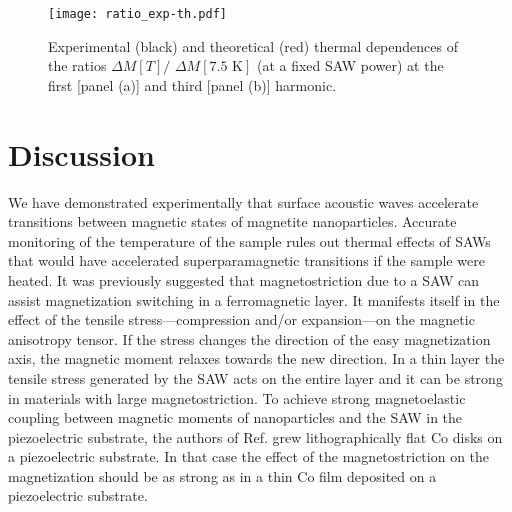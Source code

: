 \documentclass[aps,prb,floats,twocolumn]{revtex4}
\begin{document}
\begin{figure}[ht]
\begin{center}
\texttt{[image: ratio\_exp-th.pdf]}
\caption{Experimental (black) and theoretical (red) thermal dependences of the ratios $\Delta M[T]\big/$ $\Delta M[7.5\textrm{ K}]$ (at a fixed SAW power) at the first [panel (a)] and third [panel (b)] harmonic.}
\label{ratio}
\end{center}
\end{figure}

\section{Discussion}\label{discussion}

We have demonstrated experimentally that surface acoustic waves accelerate transitions between magnetic states of magnetite nanoparticles. Accurate monitoring of the temperature of the sample rules out thermal effects of SAWs that would have accelerated superparamagnetic transitions if the sample were heated. It was previously suggested \cite{Davis-APL2010,Kovalenko-PRL2013,Thevenard-PRB2013,Thevenard-PRB2014,Davis-JAP2015} that magnetostriction due to a SAW can assist magnetization switching in a ferromagnetic layer. It manifests itself in the effect of the tensile stress---compression and/or expansion---on the magnetic anisotropy tensor. If the stress changes the direction of the easy magnetization axis, the magnetic moment relaxes towards the new direction. In a thin layer the tensile stress generated by the SAW acts on the entire layer and it can be strong in materials with large magnetostriction. To achieve strong magnetoelastic coupling between magnetic moments of nanoparticles and the SAW in the piezoelectric substrate, the authors of Ref.  grew lithographically flat Co disks on a piezoelectric substrate. In that case the effect of the magnetostriction on the magnetization should be as strong as in a thin Co film deposited on a piezoelectric substrate. 
\end{document}

